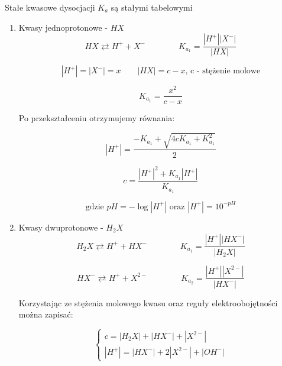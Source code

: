 \documentclass[polish,polish,a4paper,12pt]{article}
\begin{document}
	Stałe kwasowe dysocjacji $K_a$ są stałymi tabelowymi
	\begin{enumerate}
		\item Kwasy jednoprotonowe - $HX$
		\begin{equation*}
			HX \rightleftarrows H^+ + X^- \hspace{4em}K_{a_1} = \frac{|H^+||X^-|}{|HX|}
		\end{equation*}
		
		\begin{equation*}
			|H^+| = |X^-| = x \hspace{2em} |HX| = c-x \text{, c - stężenie molowe}
		\end{equation*}
		
		\begin{equation*}
			K_{a_1} = \frac{x^2}{c-x}
		\end{equation*}
		
		Po przekształceniu otrzymujemy równania:
		
		\begin{equation*}
			|H^+| = \frac{-K_{a_1} + \sqrt{4cK_{a_1} + K_{a_1}^2}}{2}
		\end{equation*}
		
		\begin{equation*}
			c = \frac{|H^+|^2+K_{a_1}|H^+|}{K_{a_1}}
		\end{equation*}
		
		\begin{equation*}
			\text{gdzie } pH = -\log |H^+| \text{ oraz } |H^+| = 10^{-pH}
		\end{equation*}
		
		\item Kwasy dwuprotonowe - $H_2X$
		\begin{equation*}
			H_2X \rightleftarrows H^+ + HX^- \hspace{4em} K_{a_1} = \frac{|H^+||HX^-|}{|H_2X|}
		\end{equation*}
		
		\begin{equation*}
			HX^- \rightleftarrows H^+ + X^{2-} \hspace{4em} K_{a_2} = \frac{|H^+||X^{2-}|}{|HX^-|}
		\end{equation*}
		
		Korzystając ze stężenia molowego kwasu oraz reguły elektroobojętności można zapisać:
		
		\begin{equation*}
			\begin{cases}
				c = |H_2X| + |HX^-| + |X^{2-}|\\
				|H^+| = |HX^-| + 2|X^{2-}| + |OH^-|
			\end{cases}
		\end{equation*}
		

\end{enumerate}
\end{document}
